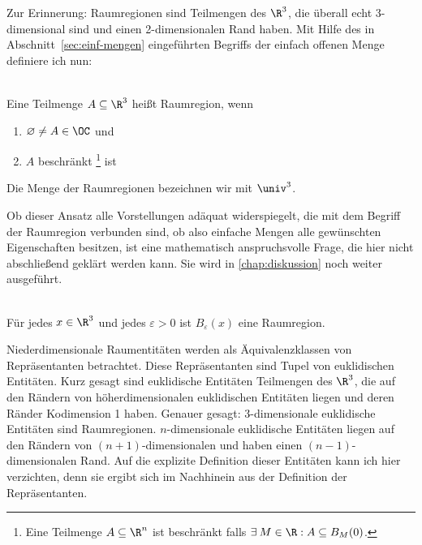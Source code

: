     Zur Erinnerung: Raumregionen sind Teilmengen des $\R^3$, die überall echt 3-dimensional sind und einen 2-dimensionalen Rand haben.%
    Mit Hilfe des in Abschnitt~\ref{sec:einf-mengen} eingeführten Begriffs der einfach offenen Menge definiere ich nun:
%    
    \begin{dfn}[Raumregion]\ \\
        Eine Teilmenge $A \subseteq \R^3$ heißt Raumregion, wenn
        \begin{enumerate}
            \item $\varnothing \neq A \in \OC$ und
            \item $A$ beschränkt%
                  \footnote{Eine Teilmenge $A \subseteq \R^n$ ist beschränkt falls $\exists\: M \in \R : A \subseteq B_M(0)$.}
                  ist
        \end{enumerate}
        Die Menge der Raumregionen bezeichnen wir mit $\univ^3$.
    \end{dfn}
%    
    Ob dieser Ansatz alle Vorstellungen adäquat widerspiegelt, die mit dem Begriff der Raumregion verbunden sind, ob also einfache Mengen alle gewünschten Eigenschaften besitzen, ist eine mathematisch anspruchsvolle Frage, die hier nicht abschließend geklärt werden kann. Sie wird in \ref{chap:diskussion} noch weiter ausgeführt.
%
    \begin{bsp}\ \\
        Für jedes $x \in \R^3$ und jedes $\varepsilon > 0$ ist $B_\varepsilon(x)$ eine Raumregion.
    \end{bsp}
%    
%
    Niederdimensionale Raumentitäten werden als Äquivalenzklassen von Repräsentanten betrachtet.
    Diese Repräsentanten sind Tupel von euklidischen Entitäten.%
    Kurz gesagt sind euklidische Entitäten Teilmengen des $\R^3$, die auf den Rändern von höherdimensionalen euklidischen Entitäten liegen und deren Ränder Kodimension 1 haben.
    Genauer gesagt: 3-dimensionale euklidische Entitäten sind Raumregionen.
    $n$-dimensionale euklidische Entitäten liegen auf den Rändern von $(n+1)$-dimensionalen und haben einen $(n-1)$-dimensionalen Rand.
    Auf die explizite Definition dieser Entitäten kann ich hier verzichten, denn sie ergibt sich im Nachhinein aus der Definition der Repräsentanten.
%
